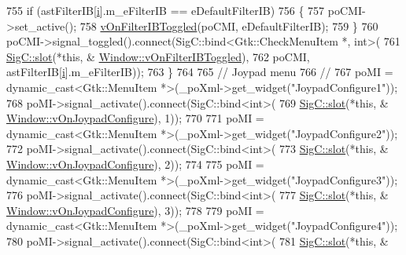 \begin{DoxyCode}
{{755     \textcolor{keywordflow}{if} (astFilterIB[\mbox{\hyperlink{expr-lex_8cpp_acb559820d9ca11295b4500f179ef6392}{i}}].m\_eFilterIB == eDefaultFilterIB)
756     \{
757       poCMI->set\_active();
758       \mbox{\hyperlink{class_v_b_a_1_1_window_afddc93921e9561601104184bb16941e5}{vOnFilterIBToggled}}(poCMI, eDefaultFilterIB);
759     \}
760     poCMI->signal\_toggled().connect(SigC::bind<Gtk::CheckMenuItem *, int>(
761                                       \mbox{\hyperlink{namespace_sig_c_a92e4f19202b77e78ac1db05f5a62f6b6}{SigC::slot}}(*\textcolor{keyword}{this}, &
      \mbox{\hyperlink{class_v_b_a_1_1_window_afddc93921e9561601104184bb16941e5}{Window::vOnFilterIBToggled}}),
762                                       poCMI, astFilterIB[\mbox{\hyperlink{expr-lex_8cpp_acb559820d9ca11295b4500f179ef6392}{i}}].m\_eFilterIB));
763   \}
764 
765   \textcolor{comment}{// Joypad menu}
766   \textcolor{comment}{//}
767   poMI = \textcolor{keyword}{dynamic\_cast<}Gtk::MenuItem *\textcolor{keyword}{>}(\_poXml->get\_widget(\textcolor{stringliteral}{"JoypadConfigure1"}));
768   poMI->signal\_activate().connect(SigC::bind<int>(
769                                     \mbox{\hyperlink{namespace_sig_c_a92e4f19202b77e78ac1db05f5a62f6b6}{SigC::slot}}(*\textcolor{keyword}{this}, &
      \mbox{\hyperlink{class_v_b_a_1_1_window_a9a72206ce2e6c13d5bd66863292f9515}{Window::vOnJoypadConfigure}}), 1));
770 
771   poMI = \textcolor{keyword}{dynamic\_cast<}Gtk::MenuItem *\textcolor{keyword}{>}(\_poXml->get\_widget(\textcolor{stringliteral}{"JoypadConfigure2"}));
772   poMI->signal\_activate().connect(SigC::bind<int>(
773                                     \mbox{\hyperlink{namespace_sig_c_a92e4f19202b77e78ac1db05f5a62f6b6}{SigC::slot}}(*\textcolor{keyword}{this}, &
      \mbox{\hyperlink{class_v_b_a_1_1_window_a9a72206ce2e6c13d5bd66863292f9515}{Window::vOnJoypadConfigure}}), 2));
774 
775   poMI = \textcolor{keyword}{dynamic\_cast<}Gtk::MenuItem *\textcolor{keyword}{>}(\_poXml->get\_widget(\textcolor{stringliteral}{"JoypadConfigure3"}));
776   poMI->signal\_activate().connect(SigC::bind<int>(
777                                     \mbox{\hyperlink{namespace_sig_c_a92e4f19202b77e78ac1db05f5a62f6b6}{SigC::slot}}(*\textcolor{keyword}{this}, &
      \mbox{\hyperlink{class_v_b_a_1_1_window_a9a72206ce2e6c13d5bd66863292f9515}{Window::vOnJoypadConfigure}}), 3));
778 
779   poMI = \textcolor{keyword}{dynamic\_cast<}Gtk::MenuItem *\textcolor{keyword}{>}(\_poXml->get\_widget(\textcolor{stringliteral}{"JoypadConfigure4"}));
780   poMI->signal\_activate().connect(SigC::bind<int>(
781                                     \mbox{\hyperlink{namespace_sig_c_a92e4f19202b77e78ac1db05f5a62f6b6}{SigC::slot}}(*\textcolor{keyword}{this}, &
}}
\end{DoxyCode}

